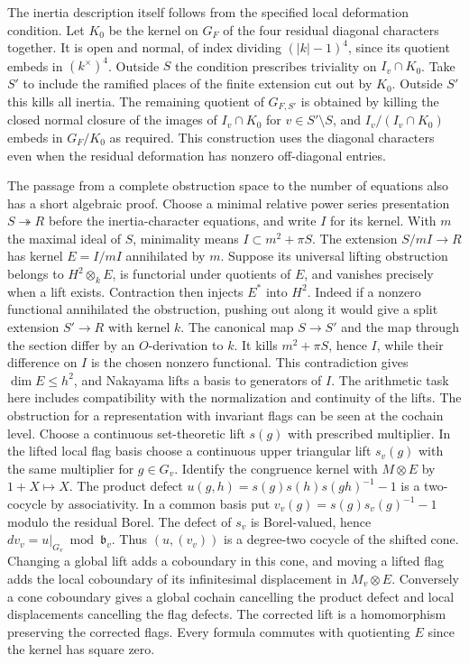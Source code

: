 \documentclass[11pt]{amsart}
\theoremstyle{definition}
\theoremstyle{remark}
\begin{document}
The inertia description
itself follows from the specified local deformation condition. Let
$K_0$ be the kernel on $G_F$ of the four residual diagonal
characters together. It is open and normal, of index dividing
$(|k|-1)^4$, since its quotient embeds in $(k^\times)^4$.
Outside $S$ the condition prescribes triviality on $I_v\cap K_0$.
Take $S'$ to include the ramified places of the finite extension
cut out by $K_0$. Outside $S'$ this kills all inertia. The remaining
quotient of $G_{F,S'}$ is obtained by killing the closed normal
closure of the images of $I_v\cap K_0$ for $v\in S'\setminus S$,
and $I_v/(I_v\cap K_0)$ embeds in $G_F/K_0$ as required.
This construction uses the diagonal characters even when the
residual deformation has nonzero off-diagonal entries.

The passage from a complete obstruction space to the number of
equations also has a short algebraic proof. Choose a minimal
relative power series presentation $S\twoheadrightarrow R$ before
the inertia-character equations, and write $I$ for its kernel.
With $m$ the maximal ideal of $S$, minimality means
$I\subset m^2+\pi S$. The extension $S/mI\to R$ has kernel
$E=I/mI$ annihilated by $m$. Suppose its universal lifting
obstruction belongs to $H^2\otimes_k E$, is functorial under
quotients of $E$, and vanishes precisely when a lift exists.
Contraction then injects $E^*$ into $H^2$. Indeed if a nonzero
functional annihilated the obstruction, pushing out along it
would give a split extension $S'\to R$ with kernel $k$.
The canonical map $S\to S'$ and the map through the section
differ by an $O$-derivation to $k$. It kills $m^2+\pi S$, hence
$I$, while their difference on $I$ is the chosen nonzero
functional. This contradiction gives $\dim E\le h^2$, and
Nakayama lifts a basis to generators of $I$. The arithmetic task
here includes compatibility with the normalization and continuity
of the lifts. The obstruction for a representation with invariant
flags can be seen at the cochain level. Choose a continuous
set-theoretic lift $s(g)$ with prescribed multiplier. In the lifted
local flag basis choose a continuous upper triangular lift $s_v(g)$
with the same multiplier for $g\in G_v$. Identify the congruence
kernel with $M\otimes E$ by $1+X\mapsto X$. The product defect
$u(g,h)=s(g)s(h)s(gh)^{-1}-1$ is a two-cocycle by associativity.
In a common basis put $v_v(g)=s(g)s_v(g)^{-1}-1$ modulo the
residual Borel. The defect of $s_v$ is Borel-valued, hence
$d v_v=u|_{G_v}\bmod\mathfrak b_v$. Thus $(u,(v_v))$ is a
degree-two cocycle of the shifted cone. Changing a global lift
adds a coboundary in this cone, and moving a lifted flag adds the
local coboundary of its infinitesimal displacement in $M_v\otimes E$.
Conversely a cone coboundary gives a global cochain cancelling the
product defect and local displacements cancelling the flag defects.
The corrected lift is a homomorphism preserving the corrected flags.
Every formula commutes with quotienting $E$ since the kernel has
square zero.
\end{document}

